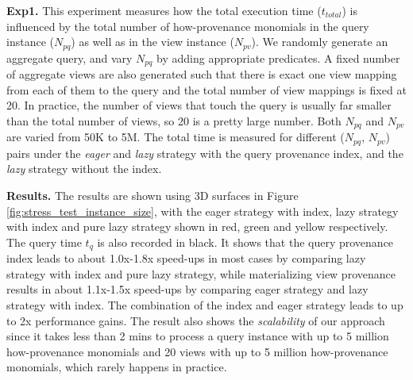 \textbf{Exp1.}  This experiment measures how the total execution time ($t_{total}$) is influenced by the total number of how-provenance monomials in the query instance ($N_{pq}$) as well as 
in the view instance ($N_{pv}$). We randomly generate an aggregate query, and vary $N_{pq}$ by adding appropriate predicates. A fixed number of aggregate views are also generated such that there is exact one view mapping from each of them to the query and the total number of view mappings is fixed at 20.  In practice, the number of views that touch the query is usually far smaller than the total number of views, so 20 is a pretty large number. Both $N_{pq}$ and $N_{pv}$ are varied from 50K to 5M. The total time is measured for different ($N_{pq}$, $N_{pv}$) pairs under the {\em eager} and {\em lazy} strategy with the query provenance index, and the {\em lazy} strategy without the index. 

\textbf{Results.} 
The results are shown using 3D surfaces in Figure \ref{fig:stress_test_instance_size}, with the eager strategy with index, lazy strategy with index and pure lazy strategy shown in red, green and yellow respectively. The query time $t_q$ is also recorded in black. It shows that the query provenance index leads to about 1.0x-1.8x speed-ups in most cases by comparing lazy strategy with index and pure lazy strategy, while materializing view provenance results in about 1.1x-1.5x speed-ups by comparing eager strategy and lazy strategy with index. The combination of the index and eager strategy leads to up to 2x performance gains. The result also shows the {\em scalability} of our approach since it takes less than 2 mins to process a query instance with up to 5 million how-provenance monomials and 20 views with up to 5 million how-provenance monomials, which rarely happens in practice. 


